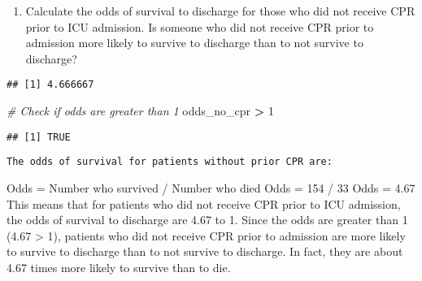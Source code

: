 \documentclass[
]{article}
\newenvironment{Shaded}{\begin{snugshade}}{\end{snugshade}}
\newcommand{\CommentTok}[1]{\textcolor[rgb]{0.56,0.35,0.01}{\textit{#1}}}
\newcommand{\DecValTok}[1]{\textcolor[rgb]{0.00,0.00,0.81}{#1}}
\newcommand{\FunctionTok}[1]{\textcolor[rgb]{0.13,0.29,0.53}{\textbf{#1}}}
\newcommand{\NormalTok}[1]{#1}
\newcommand{\OtherTok}[1]{\textcolor[rgb]{0.56,0.35,0.01}{#1}}
\newcommand{\SpecialCharTok}[1]{\textcolor[rgb]{0.81,0.36,0.00}{\textbf{#1}}}
\newcommand{\StringTok}[1]{\textcolor[rgb]{0.31,0.60,0.02}{#1}}
\providecommand{\tightlist}{%
  \setlength{\itemsep}{0pt}\setlength{\parskip}{0pt}}
\begin{document}
\begin{enumerate}
\def\labelenumi{\alph{enumi})}
\tightlist
\item
  Calculate the odds of survival to discharge for those who did not
  receive CPR prior to ICU admission. Is someone who did not receive CPR
  prior to admission more likely to survive to discharge than to not
  survive to discharge?
\end{enumerate}

\begin{Shaded}
\end{Shaded}

\begin{verbatim}
## [1] 4.666667
\end{verbatim}

\begin{Shaded}
\begin{Highlighting}[]
\CommentTok{\# Check if odds are greater than 1}
\NormalTok{odds\_no\_cpr }\SpecialCharTok{\textgreater{}} \DecValTok{1}
\end{Highlighting}
\end{Shaded}

\begin{verbatim}
## [1] TRUE
\end{verbatim}

\begin{verbatim}
The odds of survival for patients without prior CPR are:
\end{verbatim}

Odds = Number who survived / Number who died Odds = 154 / 33 Odds = 4.67
This means that for patients who did not receive CPR prior to ICU
admission, the odds of survival to discharge are 4.67 to 1. Since the
odds are greater than 1 (4.67 \textgreater{} 1), patients who did not
receive CPR prior to admission are more likely to survive to discharge
than to not survive to discharge. In fact, they are about 4.67 times
more likely to survive than to die.
\end{document}
